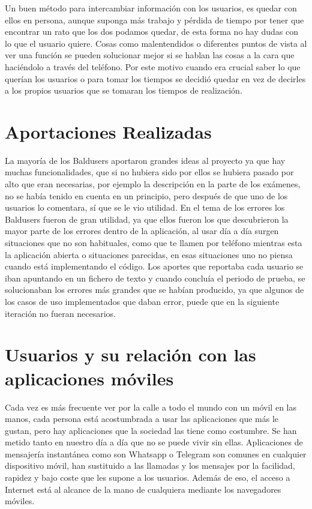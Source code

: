 Un buen método para intercambiar información con los usuarios,  es quedar con ellos en persona, aunque suponga más trabajo y pérdida de tiempo por tener que encontrar un rato que los dos podamos quedar, de esta forma no hay dudas con lo que el usuario quiere.
Cosas como malentendidos o diferentes puntos de vista al ver una función se pueden solucionar mejor si se hablan las cosas a la cara que haciéndolo a través del teléfono.
Por este motivo cuando era crucial saber lo que querían los usuarios o para tomar los tiempos se decidió quedar en vez de decirles a los propios usuarios que se tomaran los tiempos de realización.



\section{Aportaciones Realizadas}
\label{secc:aportaciones Realizadas}

La mayoría de los Baldusers aportaron grandes ideas al proyecto ya que hay muchas funcionalidades, que si no hubiera sido por ellos se hubiera pasado por alto que eran necesarias, por ejemplo la descripción en la parte de los exámenes, no se había tenido en cuenta en un principio, pero después de que uno de los usuarios lo comentara, sí que se le vio utilidad.
En el tema de los errores los Baldusers fueron de gran utilidad, ya que ellos fueron los que descubrieron la mayor parte de los errores dentro de la aplicación, al usar día a día surgen situaciones que no son habituales, como que te llamen por teléfono mientras esta la aplicación abierta o situaciones parecidas, en esas situaciones uno no piensa cuando está implementando el código.
Los aportes que reportaba cada usuario se iban apuntando en un fichero de texto y cuando concluía el periodo de prueba, se solucionaban los errores más grandes que se habían producido, ya que algunos de los casos de uso implementados que daban error, puede que en la siguiente iteración no fueran necesarios.


\section{Usuarios y su relación con las aplicaciones móviles}
\label{secc:usuarios y su relación con las aplicaciones móviles}

Cada vez es más frecuente ver por la calle a todo el mundo con un móvil en las manos, cada persona está acostumbrada a usar las aplicaciones que más le gustan, pero hay aplicaciones que la sociedad las tiene como costumbre. Se han metido tanto en nuestro día a día que no se puede vivir sin ellas. Aplicaciones de mensajería instantánea como son Whatsapp o Telegram son comunes en cualquier dispositivo móvil, han sustituido a las llamadas y los mensajes por la facilidad, rapidez y bajo coste que les supone a los usuarios.
Además de eso, el acceso a Internet está al alcance de la mano de cualquiera mediante los navegadores móviles.

